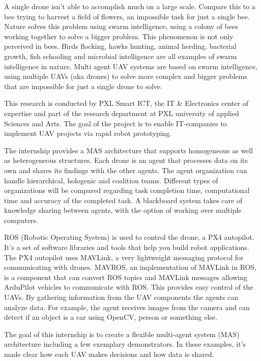 \begin{addmargin}[5ex]{0pt}
  
A single drone isn’t able to accomplish much on a large scale. Compare this to a bee trying to harvest a field of flowers, 
an impossible task for just a single bee. Nature solves this problem using swarm intelligence, using a colony of bees working together 
to solve a bigger problem. This phenomenon is not only perceived in bees. Birds flocking, hawks hunting, animal herding, bacterial 
growth, fish schooling and microbial intelligence are all examples of swarm intelligence in nature. Multi agent UAV systems are
 based on swarm intelligence, using multiple UAVs (aka drones) to solve more complex and bigger problems that are impossible for 
 just a single drone to solve.

This research is conducted by PXL Smart ICT, the IT \& Electronics center of expertise and part of the research department at 
PXL university of applied Sciences and Arts. The goal of the project is to enable IT-companies to implement UAV projects via 
rapid robot prototyping.

The internship provides a MAS architecture that supports homogeneous as well as heterogeneous structures. Each drone is an 
agent that processes data on its own and shares its findings with the other agents. The agent organization can handle hierarchical, 
hologenic and coalition teams. Different types of organizations will be compared regarding task completion time, computational time
and accuracy of the completed task. A blackboard system takes care of knowledge sharing between agents, with the option of working
 over multiple computers. 

ROS (Robotic Operating System) is used to control the drone, a PX4 autopilot. It’s a set of software libraries and tools that help 
you build robot applications. The PX4 autopilot uses MAVLink, a very lightweight messaging protocol for communicating with drones. 
MAVROS, an implementation of MAVLink in ROS, is a component that can convert ROS topics and MAVLink messages allowing ArduPilot 
vehicles to communicate with ROS. This provides easy control of the UAVs. By gathering information from the UAV components the 
agents can analyze data. For example, the agent receives images from the camera and can detect if an object is a car using OpenCV, 
person or something else.

The goal of this internship is to create a flexible multi-agent system (MAS) architecture including a few exemplary demonstrators.
 In these examples, it’s made clear how each UAV makes decisions and how data is shared.

\end{addmargin}